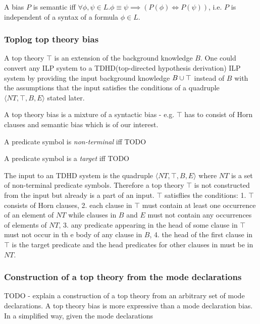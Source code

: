 \begin{defn}
A bias $P$ is semantic iff $\forall \phi, \psi \in L. \phi \equiv \psi \implies (P(\phi) \iff P(\psi))$, i.e. $P$ is independent of a syntax of a formula $\phi \in L$.
\end{defn}

\subsubsection{Toplog top theory bias\cite{muggleton2008toplog}}
A top theory $\top$ is an extension of the background knowledge $B$. One could convert any ILP system to a TDHD(top-directed hypothesis derivation) ILP system by providing the input background knowledge $B \cup \top$ instead of $B$ with the assumptions that the input satisfies the conditions of a quadruple $\langle NT, \top, B, E \rangle$ stated later.

A top theory bias is a mixture of a syntactic bias - e.g. $\top$ has to consist of Horn clauses and semantic bias which is of our interest.
\begin{defn}
A predicate symbol is \emph{non-terminal} iff TODO
\end{defn}

\begin{defn}
A predicate symbol is a \emph{target} iff TODO
\end{defn}

The input to an TDHD system is the quadruple $\langle NT, \top, B, E \rangle$ where $NT$ is a set of non-terminal  predicate symbols. Therefore a top theory $\top$ is not constructed from the input but already is a part of an input. $\top$ satisflies the conditions:
1. $\top$ consists of Horn clauses,
2. each clause in $\top$
must contain at least one occurrence of an element of $NT$ while clauses in $B$
and $E$ must not contain any occurrences of elements of $NT$,
3. any predicate appearing in the head of some clause in $\top$ must not occur in th	e body of any clause in $B$,
4. the head of the first clause in $\top$ is the target predicate and
the head predicates for other clauses in must be in $NT$.

\subsubsection{Construction of a top theory from the mode declarations\cite{muggleton2008toplog}}
TODO - explain a construction of a top theory from an arbitrary set of mode declarations.
A top theory bias is more expressive than a mode declaration bias.
In a simplified way, given the mode declarations

